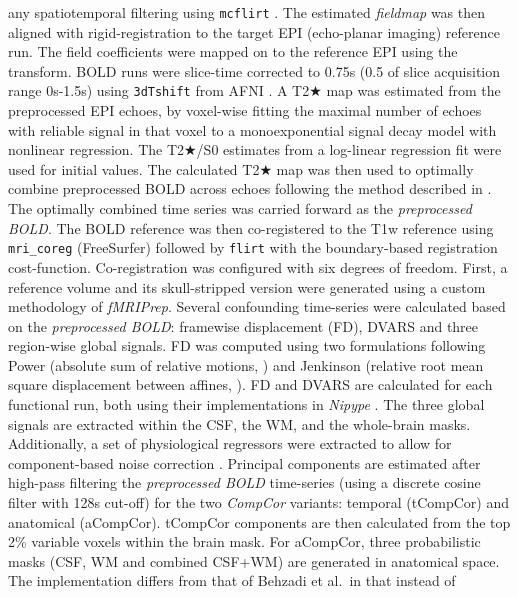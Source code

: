 \documentclass[
]{article}
\begin{document}
\begin{description}
any spatiotemporal filtering using \texttt{mcflirt} \citep[FSL
,][]{mcflirt}. The estimated \emph{fieldmap} was then aligned with
rigid-registration to the target EPI (echo-planar imaging) reference
run. The field coefficients were mapped on to the reference EPI using
the transform. BOLD runs were slice-time corrected to 0.75s (0.5 of
slice acquisition range 0s-1.5s) using \texttt{3dTshift} from AFNI
\citep[RRID:SCR\_005927]{afni}. A T2★ map was estimated from the
preprocessed EPI echoes, by voxel-wise fitting the maximal number of
echoes with reliable signal in that voxel to a monoexponential signal
decay model with nonlinear regression. The T2★/S0 estimates from a
log-linear regression fit were used for initial values. The calculated
T2★ map was then used to optimally combine preprocessed BOLD across
echoes following the method described in \citep{posse_t2s}. The
optimally combined time series was carried forward as the
\emph{preprocessed BOLD}. The BOLD reference was then co-registered to
the T1w reference using \texttt{mri\_coreg} (FreeSurfer) followed by
\texttt{flirt} \citep[FSL ,][]{flirt} with the boundary-based
registration \citep{bbr} cost-function. Co-registration was configured
with six degrees of freedom. First, a reference volume and its
skull-stripped version were generated using a custom methodology of
\emph{fMRIPrep}. Several confounding time-series were calculated based
on the \emph{preprocessed BOLD}: framewise displacement (FD), DVARS and
three region-wise global signals. FD was computed using two formulations
following Power (absolute sum of relative motions,
\citet{power_fd_dvars}) and Jenkinson (relative root mean square
displacement between affines, \citet{mcflirt}). FD and DVARS are
calculated for each functional run, both using their implementations in
\emph{Nipype} \citep[following the definitions by][]{power_fd_dvars}.
The three global signals are extracted within the CSF, the WM, and the
whole-brain masks. Additionally, a set of physiological regressors were
extracted to allow for component-based noise correction
\citep[\emph{CompCor},][]{compcor}. Principal components are estimated
after high-pass filtering the \emph{preprocessed BOLD} time-series
(using a discrete cosine filter with 128s cut-off) for the two
\emph{CompCor} variants: temporal (tCompCor) and anatomical (aCompCor).
tCompCor components are then calculated from the top 2\% variable voxels
within the brain mask. For aCompCor, three probabilistic masks (CSF, WM
and combined CSF+WM) are generated in anatomical space. The
implementation differs from that of Behzadi et al.~in that instead of

\end{description}
\end{document}
